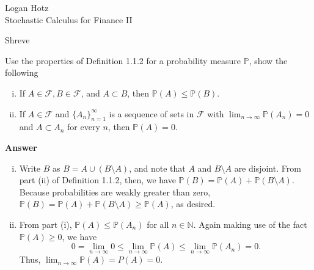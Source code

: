 \documentclass[11pt]{article}
\renewcommand\P{\mathbb{P}} %
\newcommand\cF{\mathcal{F}}
\newcounter{question}[section]
\newenvironment{hwanswer}
    {
        \vspace{2mm}
        {\bfseries Answer}
        \vspace{-\abovedisplayskip}
        \begin{center}
            \begin{tcolorbox}[
                width=0.95\textwidth,
                colback=white,
                colframe=white,
                opacityback=0,
                opacityframe=0,
                boxrule=0pt,
                frame hidden,
                breakable,
                before upper={\parindent15pt} %
            ]
            \lineskip=0pt %
    }
    {
        \end{tcolorbox}
        \end{center}
        \vspace{4mm}
    }
\newenvironment{hwheader}
    {
        \begin{flushright}
            \begin{tcolorbox}[
                width=0.55\textwidth,
                colback=tlightblue,
                colframe=tblue,
                opacityback=0.25,
                enhanced jigsaw
            ]
                \begin{flushright}
                    Logan Hotz \\
    }
    {
                \end{flushright}
            \end{tcolorbox}
        \end{flushright}
        \vspace{4mm}
    }
\begin{document}
    \begin{hwheader}
        Stochastic Calculus for Finance II

        Shreve
    \end{hwheader}





    \begin{hwquestion}
        Use the properties of Definition 1.1.2 for a probability measure $\P$, show the
        following
        \begin{enumerate}[(i), nolistsep]
            \item If $A \in \cF, B \in \cF$, and $A \subset B$, then $\P(A) \leq \P(B)$.
            \item If $A \in \cF$ and $\{ A_n \}_{n=1}^{\infty}$ is a sequence of sets in
            $\cF$ with $\lim_{n \to \infty} \P(A_n) = 0$ and $A \subset A_n$ for every $n$,
            then $\P(A) = 0$.
        \end{enumerate}
    \end{hwquestion}

    \begin{hwanswer}
        \begin{enumerate}[(i)]
            \item Write $B$ as $B = A \cup (B \setminus A)$, and note that $A$ and $B
            \setminus A$ are disjoint. From part (ii) of Definition 1.1.2, then, we have
            $\P(B) = \P(A) + \P(B \setminus A)$. Because probabilities are weakly greater
            than zero, $\P(B) = \P(A) + \P(B \setminus A) \geq \P(A)$, as desired.

            \item From part (i), $\P(A) \leq \P(A_n)$ for all $n \in \mathbb{N}$. Again
            making use of the fact $\P(A) \geq 0$, we have
            \[
                0
                =
                \lim_{n \to \infty} 0
                \leq
                \lim_{n \to \infty} \P(A)
                \leq
                \lim_{n \to \infty} \P(A_n)
                = 0.
            \]
            Thus, $\lim_{n \to \infty} \P(A) = P(A) = 0$.
        \end{enumerate}
    \end{hwanswer}
\end{document}
